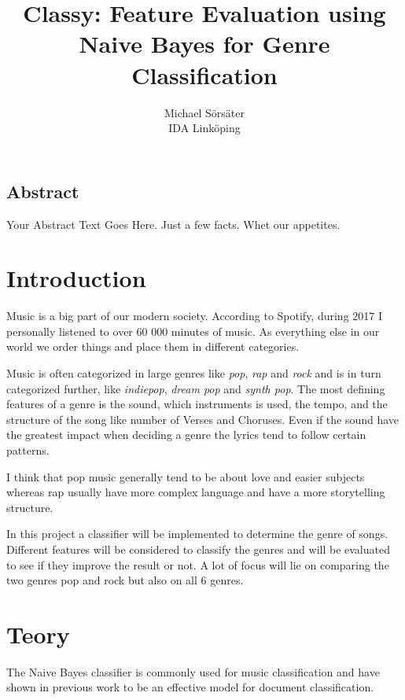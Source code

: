 \documentclass[a4paper, 12pt]{article}
\begin{document}
\date{}

\title{\Large Classy: Feature Evaluation using Naive Bayes for Genre Classification}

\author{
{Michael Sörsäter}\\
IDA Linköping
}

\maketitle


\subsection*{Abstract}
Your Abstract Text Goes Here.  Just a few facts.
Whet our appetites.

\section{Introduction}
Music is a big part of our modern society.
According to Spotify, during 2017 I personally listened to over 60 000 minutes of music.
As everything else in our world we order things and place them in different categories.

Music is often categorized in large genres like \textit{pop}, \textit{rap} and \textit{rock} and is in turn categorized further, like \textit{indiepop}, \textit{dream pop} and \textit{synth pop}.
The most defining features of a genre is the sound, which instruments is used, the tempo, and the structure of the song like number of Verses and Choruses.
Even if the sound have the greatest impact when deciding a genre the lyrics tend to follow certain patterns.

I think that pop music generally tend to be about love and easier subjects whereas rap usually have more complex language and have a more storytelling structure.

In this project a classifier will be implemented to determine the genre of songs.
Different features will be considered to classify the genres and will be evaluated to see if they improve the result or not.
A lot of focus will lie on comparing the two genres pop and rock but also on all 6 genres.

\section{Teory}
The Naive Bayes classifier is commonly used for music classification and have shown in previous work to be an effective model for document classification. 
\end{document}
